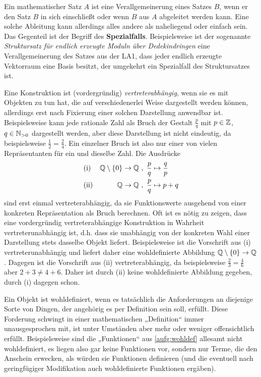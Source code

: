 \begin{description}[labelindent=0pt, leftmargin=0pt]
    \item[Verallgemeinerung:] Ein mathematischer Satz $A$ ist eine Verallgemeinerung eines Satzes $B$, wenn er den Satz $B$ in sich einschließt oder wenn $B$ aus $A$ abgeleitet werden kann. Eine solche Ableitung kann allerdings alles andere als naheliegend oder einfach sein. Das Gegenteil ist der Begriff des \textbf{Spezialfalls}. Beispielsweise ist der sogenannte \emph{Struktursatz für endlich erzeugte Moduln über Dedekindringen} eine Verallgemeinerung des Satzes aus der LA1, dass jeder endlich erzeugte Vektorraum eine Basis besitzt, der umgekehrt ein Spezialfall des Struktursatzes ist.
    
    \item[Vertreterabhängig:]  Eine Konstruktion ist (vordergründig) \emph{vertreterabhängig}, wenn sie es mit Objekten zu tun hat, die auf verschiedenerlei Weise dargestellt werden können, allerdings erst nach Fixierung einer solchen Darstellung anwendbar ist. Beispielsweise kann jede rationale Zahl als Bruch der Gestalt $\frac{p}{q}$ mit $p\in \mathbb Z$, $q\in \mathbb N_{>0}$ dargestellt werden, aber diese Darstellung ist nicht eindeutig, da beispielsweise $\frac{1}{2}=\frac{2}{4}$. Ein einzelner Bruch ist also nur einer von vielen Repräsentanten für ein und dieselbe Zahl. Die Ausdrücke
    \begin{align*}
        &\text{(i)} & \Q\setminus \{0\} \to \Q \ & ,\ \frac{p}{q} \mapsto \frac{q}{p} \\
        &\text{(ii)} & \Q \to \Q \ & ,\ \frac{p}{q} \mapsto p+q
    \end{align*}
    sind erst einmal vertreterabhängig, da sie Funktionswerte ausgehend von einer konkreten Repräsentation als Bruch berechnen. Oft ist es nötig zu zeigen, dass eine vordergründig vertreterabhängige Konstruktion in Wahrheit vertreterunabhängig ist, d.h. dass sie unabhängig von der konkreten Wahl einer Darstellung stets dasselbe Objekt liefert. Beispielsweise ist die Vorschrift aus (i) vertreterunabhängig und liefert daher eine wohldefinierte Abbildung $\mathbb Q\setminus \{0\}\to \mathbb Q$. Dagegen ist die Vorschrift aus (ii) vertreterabhängig, da beispielsweise $\frac{2}{3}=\frac{4}{6}$ aber $2+3\neq 4+6$. Daher ist durch (ii) keine wohldefinierte Abbildung gegeben, durch (i) dagegen schon.
    
    \item[Wohldefiniert:]  Ein Objekt ist wohldefiniert, wenn es tatsächlich die Anforderungen an diejenige Sorte von Dingen, der angehörig es per Definition sein soll, erfüllt. Diese Forderung schwingt in einer mathematischen „Definition“ immer unausgesprochen mit, ist unter Umständen aber mehr oder weniger offensichtlich erfüllt. Beispielsweise sind die „Funktionen“ aus \cref{aufg:wohldef} allesamt nicht wohldefiniert, es liegen also gar keine Funktionen vor, sondern nur Terme, die den Anschein erwecken, als würden sie Funktionen definieren (und die eventuell nach geringfügiger Modifikation auch wohldefinierte Funktionen ergäben).
    
\end{description}





